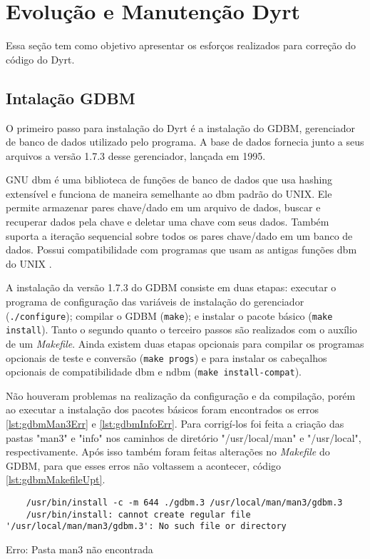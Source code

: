\section[Evolução e Manutenção Dyrt]{Evolução e Manutenção Dyrt}
\label{section:evolDyrt}

Essa seção tem como objetivo apresentar os esforços realizados para correção do código do Dyrt.

\subsection{Intalação GDBM}

O primeiro passo para instalação do Dyrt é a instalação do GDBM, gerenciador de banco de dados utilizado 
pelo programa. A base de dados fornecia junto a seus arquivos a versão 1.7.3 desse gerenciador, lançada em 1995.

GNU dbm é uma biblioteca de funções de banco de dados que usa hashing extensível e funciona de maneira 
semelhante ao dbm padrão do UNIX. Ele permite armazenar pares chave/dado em um arquivo de dados, buscar 
e recuperar dados pela chave e deletar uma chave com seus dados. Também suporta a iteração sequencial 
sobre todos os pares chave/dado em um banco de dados. Possui compatibilidade com programas que usam as 
antigas funções dbm do UNIX \cite{GDBM}.

A instalação da versão 1.7.3 do GDBM consiste em duas etapas: executar o programa de configuração das 
variáveis de instalação do gerenciador (\verb|./configure|); compilar o GDBM (\verb|make|); 
e instalar o pacote básico (\verb|make install|). Tanto o segundo quanto o terceiro passos são realizados 
com o auxílio de um \textit{Makefile}. Ainda existem duas etapas opcionais para compilar os programas 
opcionais de teste e conversão (\verb|make progs|) e para instalar os cabeçalhos opcionais de 
compatibilidade dbm e ndbm (\verb|make install-compat|).

Não houveram problemas na realização da configuração e da compilação, porém ao executar a instalação dos 
pacotes básicos foram encontrados os erros \ref{lst:gdbmMan3Err} e \ref{lst:gdbmInfoErr}. Para corrigí-los 
foi feita a criação das pastas "man3" e "info" nos caminhos de diretório "/usr/local/man" e "/usr/local", 
respectivamente. Após isso também foram feitas alterações no \textit{Makefile} do GDBM, para que esses 
erros não voltassem a acontecer, código \ref{lst:gdbmMakefileUpt}.

\begin{listing}[!ht]
    \begin{verbatim}
    /usr/bin/install -c -m 644 ./gdbm.3 /usr/local/man/man3/gdbm.3
    /usr/bin/install: cannot create regular file '/usr/local/man/man3/gdbm.3': No such file or directory
    \end{verbatim}
\caption{Erro: Pasta man3 não encontrada}
\label{lst:gdbmMan3Err}
\end{listing}

